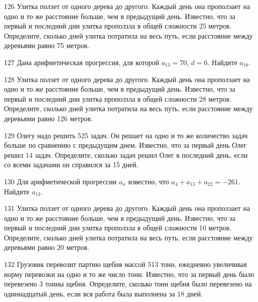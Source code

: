 \documentclass[4apaper]{article}
\begin{document}
\begin{taskBN}{126}
 Улитка ползет от одного дерева до другого. Каждый день она проползает на одно и то же расстояние больше, чем в предыдущий день. Известно, что за первый и последний дни улитка проползла в общей сложности 25 метров. Определите, сколько дней улитка потратила на весь путь, если расстояние между деревьями равно 75 метров.
\end{taskBN}

\begin{taskBN}{127}
Дана арифметическая прогрессия, для которой $a_{13} = 70$, $d=6$. Найдите $a_{18}$.
\end{taskBN}

\begin{taskBN}{128}
 Улитка ползет от одного дерева до другого. Каждый день она проползает на одно и то же расстояние больше, чем в предыдущий день. Известно, что за первый и последний дни улитка проползла в общей сложности 28 метров. Определите, сколько дней улитка потратила на весь путь, если расстояние между деревьями равно 126 метров.
\end{taskBN}

\begin{taskBN}{129}
Олегу надо решить 525 задач. Он решает на одно и то же количество задач больше по сравнению с предыдущим днем. Известно, что за первый день Олег решил 14 задач. Определите, сколько задач решил Олег в последний день, если со всеми задачами он справился за 15 дней.
\end{taskBN}

\begin{taskBN}{130}
Для арифметической прогрессии ${a_n}$ известно, что $a_{4} + a_{13} + a_{22}= -261$. Найдите $a_{13}$.
\end{taskBN}

\begin{taskBN}{131}
 Улитка ползет от одного дерева до другого. Каждый день она проползает на одно и то же расстояние больше, чем в предыдущий день. Известно, что за первый и последний дни улитка проползла в общей сложности 10 метров. Определите, сколько дней улитка потратила на весь путь, если расстояние между деревьями равно 20 метров.
\end{taskBN}

\begin{taskBN}{132}
Грузовик перевозит партию щебня массой 513 тонн, ежедневно увеличивая норму перевозки на одно и то же число тонн. Известно, что за первый день было перевезено 3 тонны щебня. Определите, сколько тонн щебня было перевезено на одиннадцатый день, если вся работа была выполнена за 18 дней.
\end{taskBN}
\end{document}
